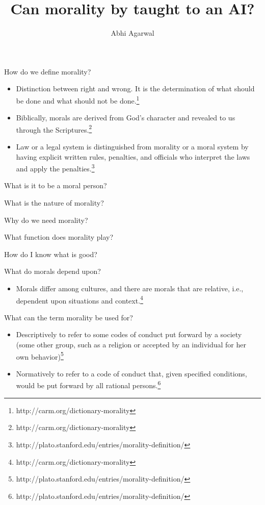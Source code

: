 \documentclass[11pt, oneside]{article}   	%
\title{Can morality by taught to an AI?}
\author{Abhi Agarwal}
\date{}							%
\begin{document}
\maketitle

\par How do we define morality?
\begin{itemize}
	\item Distinction between right and wrong. It is the determination of what should be done and what should not be done.\footnote{http://carm.org/dictionary-morality}
	\item Biblically, morals are derived from God's character and revealed to us through the Scriptures.\footnote{http://carm.org/dictionary-morality}
	\item Law or a legal system is distinguished from morality or a moral system by having explicit written rules, penalties, and officials who interpret the laws and apply the penalties.\footnote{http://plato.stanford.edu/entries/morality-definition/}
\end{itemize}

\par What is it to be a moral person?

\par What is the nature of morality?

\par Why do we need morality?

\par What function does morality play?

\par How do I know what is good?

\par What do morals depend upon?
\begin{itemize}
	\item Morals differ among cultures, and there are morals that are relative, i.e., dependent upon situations and context.\footnote{http://carm.org/dictionary-morality}
\end{itemize}

\par What can the term morality be used for?
\begin{itemize}
	\item Descriptively to refer to some codes of conduct put forward by a society (some other group, such as a religion or accepted by an individual for her own behavior)\footnote{http://plato.stanford.edu/entries/morality-definition/}
	\item Normatively to refer to a code of conduct that, given specified conditions, would be put forward by all rational persons.\footnote{http://plato.stanford.edu/entries/morality-definition/}
\end{itemize}
\end{document}
